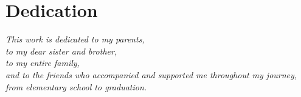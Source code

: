 \chapter*{Dedication}

\begin{center}
\emph{
This work is dedicated to my parents,\\[0.4cm]
to my dear sister and brother,\\[0.4cm]
to my entire family,\\[0.4cm]
and to the friends who accompanied and supported me throughout my journey,\\
from elementary school to graduation.
}
\end{center}
